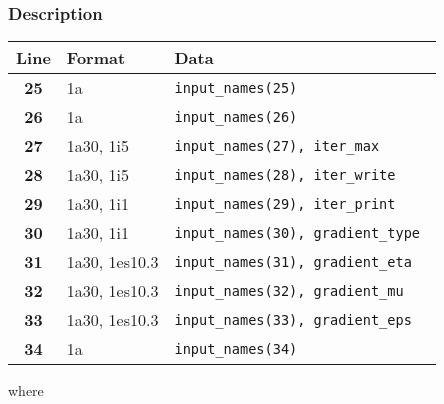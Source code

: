 \documentclass[a4paper,11pt]{article}
\begin{document}
\subsubsection*{Description}
\begin{center}
\begin{tabular}{|c|l|l|}
\hline
Line & Format & Data \\
\hline
 \textbf{25}   & 1a            & \tt input\_names(25)                 \\
 \textbf{26}   & 1a            & \tt input\_names(26)                 \\
 \textbf{27}   & 1a30, 1i5     & \tt input\_names(27), iter\_max      \\
 \textbf{28}   & 1a30, 1i5     & \tt input\_names(28), iter\_write    \\
 \textbf{29}   & 1a30, 1i1     & \tt input\_names(29), iter\_print    \\
 \textbf{30}   & 1a30, 1i1     & \tt input\_names(30), gradient\_type \\
 \textbf{31}   & 1a30, 1es10.3 & \tt input\_names(31), gradient\_eta  \\
 \textbf{32}   & 1a30, 1es10.3 & \tt input\_names(32), gradient\_mu   \\
 \textbf{33}   & 1a30, 1es10.3 & \tt input\_names(33), gradient\_eps  \\
 \textbf{34}   & 1a            & \tt input\_names(34)                 \\
\hline
\end{tabular}
\end{center}
where 
\end{document}
